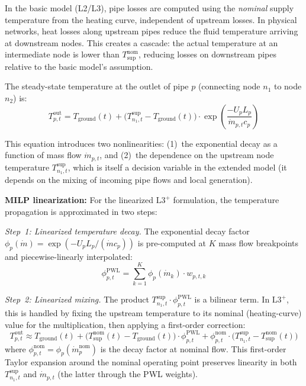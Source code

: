 \documentclass[review,3p]{elsarticle}
\newcommand{\Lplus}{\mathrm{L3}^{+}}
\begin{document}
In the basic model (L2/L3), pipe losses are computed using the
\emph{nominal} supply temperature from the heating curve,
independent of upstream losses. In physical networks, heat losses
along upstream pipes reduce the fluid temperature arriving at
downstream nodes. This creates a cascade: the actual temperature
at an intermediate node is lower than $T_{\mathrm{sup}}^{\mathrm{nom}}$,
reducing losses on downstream pipes relative to the basic model's
assumption.

The steady-state temperature at the outlet of pipe $p$ (connecting
node $n_1$ to node $n_2$) is:
\begin{equation}
T_{p,t}^{\mathrm{out}} = T_{\mathrm{ground}}(t)
+ \big(T_{n_1,t}^{\mathrm{sup}} - T_{\mathrm{ground}}(t)\big)
\cdot \exp\!\left(\frac{-U_p L_p}{\dot{m}_{p,t} c_p}\right)
\label{eq:temp_prop}
\end{equation}

This equation introduces two nonlinearities:
(1)~the exponential decay as a function of mass flow
$\dot{m}_{p,t}$, and (2)~the dependence on the upstream node
temperature $T_{n_1,t}^{\mathrm{sup}}$, which is itself a decision
variable in the extended model (it depends on the mixing of incoming
pipe flows and local generation).

\textbf{MILP linearization:} For the linearized $\Lplus$
formulation, the temperature propagation is approximated in two
steps:

\emph{Step~1: Linearized temperature decay.} The exponential decay
factor $\phi_p(\dot{m}) = \exp(-U_p L_p / (\dot{m} c_p))$ is
pre-computed at $K$ mass flow breakpoints and piecewise-linearly
interpolated:
\begin{equation}
\phi_{p,t}^{\mathrm{PWL}} = \sum_{k=1}^{K}
\phi_p(\dot{m}_k) \cdot w_{p,t,k}
\label{eq:decay_pwl}
\end{equation}

\emph{Step~2: Linearized mixing.} The product
$T_{n_1,t}^{\mathrm{sup}} \cdot \phi_{p,t}^{\mathrm{PWL}}$ is a
bilinear term. In $\Lplus$, this is handled by fixing the upstream
temperature to its nominal (heating-curve) value for the
multiplication, then applying a first-order correction:
\begin{equation}
T_{p,t}^{\mathrm{out}} \approx T_{\mathrm{ground}}(t)
+ \big(T_{\mathrm{sup}}^{\mathrm{nom}}(t)
- T_{\mathrm{ground}}(t)\big) \cdot \phi_{p,t}^{\mathrm{PWL}}
+ \phi_{p,t}^{\mathrm{nom}}
\cdot \big(T_{n_1,t}^{\mathrm{sup}}
- T_{\mathrm{sup}}^{\mathrm{nom}}(t)\big)
\label{eq:temp_prop_lin}
\end{equation}
where $\phi_{p,t}^{\mathrm{nom}} = \phi_p(\dot{m}_p^{\mathrm{nom}})$
is the decay factor at nominal flow. This first-order Taylor
expansion around the nominal operating point preserves linearity in
both $T_{n_1,t}^{\mathrm{sup}}$ and $\dot{m}_{p,t}$ (the latter
through the PWL weights).
\end{document}
